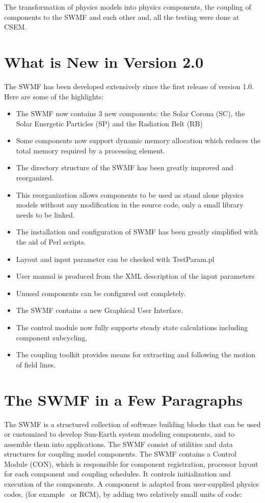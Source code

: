 The transformation of physics models into physics components,
the coupling of components to the SWMF and each other and,
all the testing were done at CSEM.

\section{What is New in Version 2.0}

The SWMF has been developed extensively since the first release of
version 1.0. Here are some of the highlights:
\begin{itemize}
\item The SWMF now contains 3 new components:
      the Solar Corona (SC), the Solar Energetic Particles (SP) 
      and the Radiation Belt (RB)
\item Some components now support dynamic memory allocation which 
      reduces the total memory required by a processing element. 
\item The directory structure of the SWMF has been greatly improved and 
      reorganized. 
\item This reorganization allows components to be used as stand alone 
      physics models without any modification in the source code,
      only a small library needs to be linked.
\item The installation and configuration of SWMF has been greatly simplified
      with the aid of Perl scripts. 
\item Layout and input parameter can be checked with TestParam.pl
\item User manual is produced from the XML description of the input parameters 
\item Unused components can be configured out completely.
\item The SWMF contains a new Graphical User Interface. 
\item The control module now fully supports steady state calculations 
      including component subcycling. 
\item The coupling toolkit provides means for extracting and following 
      the motion of field lines.
\end{itemize}

\section{The SWMF in a Few Paragraphs}

The SWMF is a structured collection of software building blocks that
can be used or customized to develop Sun-Earth system modeling
components, and to assemble them into applications. The SWMF consist
of utilities and data structures for coupling model components. The
SWMF contains a Control Module (CON), which is responsible for
component registration, processor layout for each component and
coupling schedules.  It controls initialization and execution of the
components. A component is adapted from user-supplied physics codes,
(for example \BATSRUS\ or RCM), by adding two relatively small units
of code:

